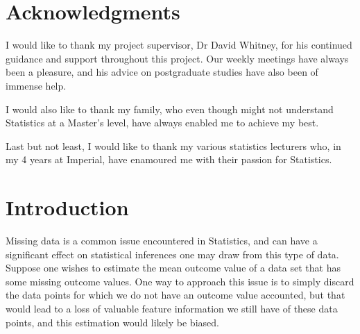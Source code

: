 \documentclass[12pt,twoside]{article}
\date{June 2021}
\begin{document}



\clearpage{\pagestyle{empty}\cleardoublepage}
\setcounter{page}{1}
\pagestyle{fancy}
\setlength{\parindent}{5ex}
\begin{abstract}


\end{abstract}

\clearpage
\section*{Acknowledgments}
I would like to thank my project supervisor, Dr David Whitney, for his continued guidance and support throughout this project. Our weekly meetings have always been a pleasure, and his advice on postgraduate studies have also been of immense help. 

I would also like to thank my family, who even though might not understand Statistics at a Master's level, have always enabled me to achieve my best.

Last but not least, I would like to thank my various statistics lecturers who, in my 4 years at Imperial, have enamoured me with their passion for Statistics.

\clearpage{\pagestyle{empty}\cleardoublepage}

\tableofcontents 

\clearpage
\listoffigures
\listoftables

\clearpage
{}
\setcounter{page}{1}
\fancyhead[L]{\textsl{\leftmark}}

\section{Introduction} 

Missing data is a common issue encountered in Statistics, and can have a significant effect on statistical inferences one may draw from this type of data. Suppose one wishes to estimate the mean outcome value of a data set that has some missing outcome values. One way to approach this issue is to simply discard the data points for which we do not have an outcome value accounted, but that would lead to a loss of valuable feature information we still have of these data points, and this estimation would likely be biased.
\end{document}
